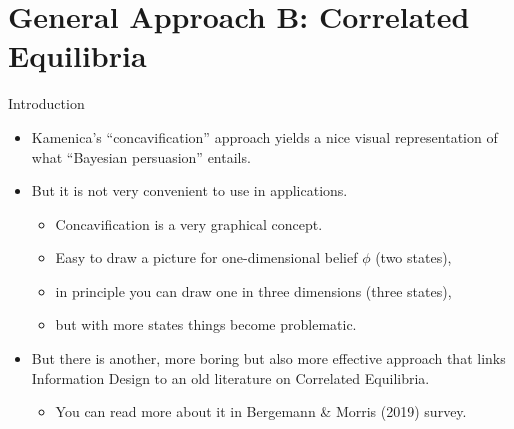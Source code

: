 \documentclass[english,10pt
,aspectratio=169
]{beamer}
\begin{document}
\section{General Approach B: Correlated Equilibria}

\begin{frame}{Introduction}
\begin{itemize}
	\item Kamenica's ``concavification'' approach yields a nice visual representation of what ``Bayesian persuasion'' entails.
	\item But it is not very convenient to use in applications.
	\begin{itemize}
		\item Concavification is a very graphical concept.
		\item Easy to draw a picture for one-dimensional belief $\phi$ (two states),
		\item in principle you can draw one in three dimensions (three states),
		\item but with more states things become problematic.
	\end{itemize}
	\item But there is another, more boring but also more effective approach that links Information Design to an old literature on Correlated Equilibria.
	\begin{itemize}
		\item You can read more about it in Bergemann \& Morris (2019) survey.
	\end{itemize}
\end{itemize}
\end{frame}
\end{document}
